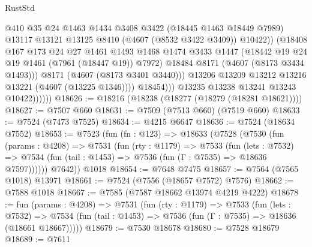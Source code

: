 \begin{lexlean}{RustStd}
\begin{coremodule}
                                @410
                                @35
                                @24
                                @1463
                                @1434
                                @3408
                                @3422
                                (@18445 @1463 @18449 @7989)
                                @13117
                                @13121
                                @13125
                                @8410
                                (@4607 (@8532 @3422 @3409))
                                @10422))
                            (@18408
                              @167
                              @173
                              @24
                              @27
                              @1461
                              @1493
                              @1468
                              @1474
                              @3433
                              @1447
                              (@18442 @19 @24 @19 @1461 (@7961 (@18447 @19)) @7972)
                              @18484
                              @8171
                              (@4607 (@8173 @3434 @1493)))
                            @8171
                            (@4607 (@8173 @3401 @3440)))
                          @13206
                          @13209
                          @13212
                          @13216
                          @13221
                          (@4607 (@13225 @1346))))
                      @18454)))
                @13235
                @13238
                @13241
                @13243
                @10422))))))
@18626 := @18216 (@18238 (@18277 (@18279 (@18281 @18621))))
@18627 := @7507 @660
@18631 := @7509 (@7513 @660) (@7519 @660)
@18633 := @7524 (@7473 @7525)
@18634 := @4215 @6647
@18636 := @7524 (@18634 @7552)
@18653 := @7523
    (fun (fn : @123) =>
    @18633
      (@7528
        (@7530
          (fun (params : @4208) =>
          @7531
            (fun (rty : @1179) =>
            @7533
              (fun (lets : @7532) =>
              @7534 (fun (tail : @1453) => @7536 (fun (Γ : @7535) => @18636 @7597))))))
        @7642))
    @1018
@18654 := @7648 @7475
@18657 := @7564 (@7565 @1018) @13971
@18661 := @7524 (@7556 (@18657 @7572) @7576)
@18662 := @7588 @1018
@18667 := @7585 (@7587 @18662 @13974 @4219 @4222)
@18678 := fun (params : @4208) =>
  @7531
    (fun (rty : @1179) =>
    @7533
      (fun (lets : @7532) =>
      @7534 (fun (tail : @1453) => @7536 (fun (Γ : @7535) => @18636 (@18661 @18667)))))
@18679 := @7530 @18678
@18680 := @7528 @18679
@18689 := @7611

\end{coremodule}
\end{lexlean}
